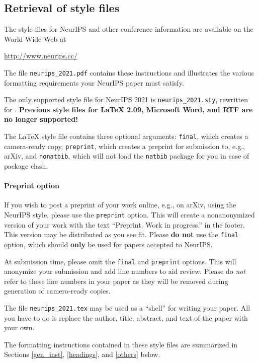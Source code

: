 \documentclass{article}
\begin{document}
\subsection{Retrieval of style files}

The style files for NeurIPS and other conference information are available on
the World Wide Web at
\begin{center}
  \url{http://www.neurips.cc/}
\end{center}
The file \verb+neurips_2021.pdf+ contains these instructions and illustrates the
various formatting requirements your NeurIPS paper must satisfy.

The only supported style file for NeurIPS 2021 is \verb+neurips_2021.sty+,
rewritten for \LaTeXe{}.  \textbf{Previous style files for \LaTeX{} 2.09,
  Microsoft Word, and RTF are no longer supported!}

The \LaTeX{} style file contains three optional arguments: \verb+final+, which
creates a camera-ready copy, \verb+preprint+, which creates a preprint for
submission to, e.g., arXiv, and \verb+nonatbib+, which will not load the
\verb+natbib+ package for you in case of package clash.

\paragraph{Preprint option}
If you wish to post a preprint of your work online, e.g., on arXiv, using the
NeurIPS style, please use the \verb+preprint+ option. This will create a
nonanonymized version of your work with the text ``Preprint. Work in progress.''
in the footer. This version may be distributed as you see fit. Please \textbf{do
  not} use the \verb+final+ option, which should \textbf{only} be used for
papers accepted to NeurIPS.

At submission time, please omit the \verb+final+ and \verb+preprint+
options. This will anonymize your submission and add line numbers to aid
review. Please do \emph{not} refer to these line numbers in your paper as they
will be removed during generation of camera-ready copies.

The file \verb+neurips_2021.tex+ may be used as a ``shell'' for writing your
paper. All you have to do is replace the author, title, abstract, and text of
the paper with your own.

The formatting instructions contained in these style files are summarized in
Sections \ref{gen_inst}, \ref{headings}, and \ref{others} below.
\end{document}
